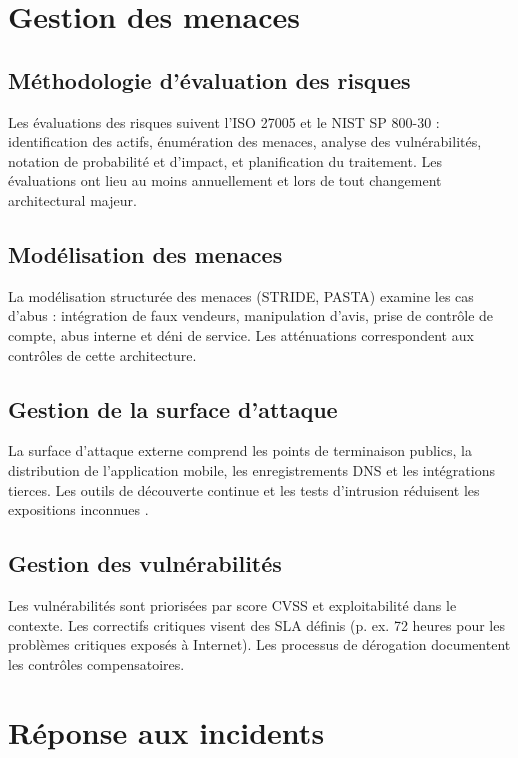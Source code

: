\section{Gestion des menaces}

\subsection{Méthodologie d'évaluation des risques}

Les évaluations des risques suivent l'ISO 27005 et le NIST SP 800-30 \parencite{iso27005,nist80030} : identification des actifs, énumération des menaces, analyse des vulnérabilités, notation de probabilité et d'impact, et planification du traitement. Les évaluations ont lieu au moins annuellement et lors de tout changement architectural majeur.

\subsection{Modélisation des menaces}

La modélisation structurée des menaces (STRIDE, PASTA) examine les cas d'abus : intégration de faux vendeurs, manipulation d'avis, prise de contrôle de compte, abus interne et déni de service. Les atténuations correspondent aux contrôles de cette architecture.

\subsection{Gestion de la surface d'attaque}

La surface d'attaque externe comprend les points de terminaison publics, la distribution de l'application mobile, les enregistrements DNS et les intégrations tierces. Les outils de découverte continue et les tests d'intrusion réduisent les expositions inconnues \parencite{owaspASVS}.

\subsection{Gestion des vulnérabilités}

Les vulnérabilités sont priorisées par score CVSS et exploitabilité dans le contexte. Les correctifs critiques visent des SLA définis (p. ex. 72 heures pour les problèmes critiques exposés à Internet). Les processus de dérogation documentent les contrôles compensatoires.

\section{Réponse aux incidents}

